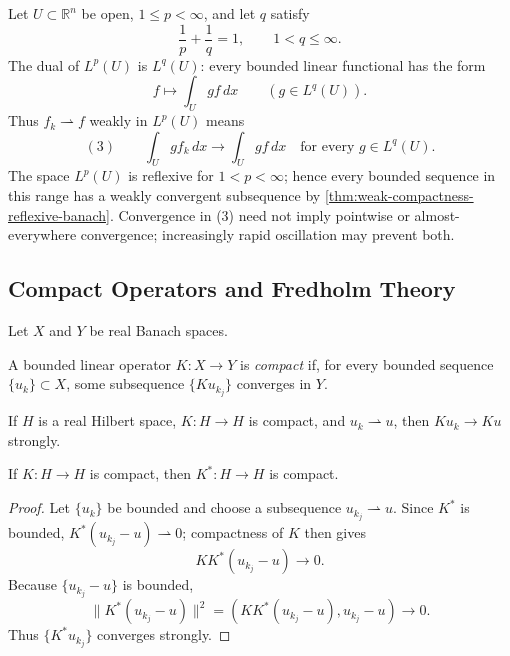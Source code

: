 \begin{example}
\label{ex:weak-convergence-lp-duality}
Let $U\subset\mathbb R^n$ be open, $1\leq p<\infty$, and let $q$ satisfy
\[
\frac1p+\frac1q=1,
\qquad 1<q\leq\infty.
\]
The dual of $L^p(U)$ is $L^q(U)$: every bounded linear functional has the form
\[
f\longmapsto\int_Ugf\,dx
\qquad(g\in L^q(U)).
\]
Thus $f_k\rightharpoonup f$ weakly in $L^p(U)$ means
\[
(3)\qquad
\int_Ugf_k\,dx\longrightarrow\int_Ugf\,dx
\quad\text{for every }g\in L^q(U).
\]
The space $L^p(U)$ is reflexive for $1<p<\infty$; hence every bounded sequence in this range has a weakly convergent subsequence by \cref{thm:weak-compactness-reflexive-banach}. Convergence in (3) need not imply pointwise or almost-everywhere convergence; increasingly rapid oscillation may prevent both.
\end{example}

\subsection{Compact Operators and Fredholm Theory}
\label{sec:compact-operators-fredholm-theory}

Let $X$ and $Y$ be real Banach spaces.

\begin{definition}
\label{def:compact-linear-operator}
A bounded linear operator $K:X\to Y$ is \textit{compact} if, for every bounded sequence $\{u_k\}\subset X$, some subsequence $\{Ku_{k_j}\}$ converges in $Y$.
\end{definition}

\begin{remark}
\label{rem:compact-operator-weak-to-strong-convergence}
If $H$ is a real Hilbert space, $K:H\to H$ is compact, and $u_k\rightharpoonup u$, then $Ku_k\to Ku$ strongly.
\end{remark}

\begin{theorem}
\label{thm:compactness-of-adjoint-operator}
If $K:H\to H$ is compact, then $K^*:H\to H$ is compact.
\end{theorem}
\begin{proof}
\sketch Let $\{u_k\}$ be bounded and choose a subsequence $u_{k_j}\rightharpoonup u$. Since $K^*$ is bounded, $K^*(u_{k_j}-u)\rightharpoonup0$; compactness of $K$ then gives
\[
KK^*(u_{k_j}-u)\to0.
\]
Because $\{u_{k_j}-u\}$ is bounded,
\[
\|K^*(u_{k_j}-u)\|^2
=(KK^*(u_{k_j}-u),u_{k_j}-u)\to0.
\]
Thus $\{K^*u_{k_j}\}$ converges strongly.
\end{proof}

